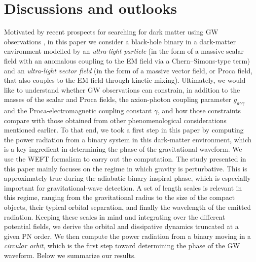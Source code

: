 \section{Discussions and outlooks}\label{disc}
Motivated by recent prospects for searching for dark matter using GW observations \cite{Zhang:2021mks, Coogan:2021uqv, Singh:2022wvw, Becker:2021ivq, Yue:2019ozq, Cardoso:2020iji,Bhattacharya:2023stq}, in this paper we consider a black-hole binary in a dark-matter environment modelled by an \textit{ultra-light particle} (in the form of a massive scalar field with an anomalous coupling to the EM field via a Chern--Simons-type term) and an \textit{ultra-light vector field} (in the form of a massive vector field, or Proca field, that also couples to the EM field through kinetic mixing). Ultimately, we would like to understand whether GW observations can constrain, in addition to the masses of the scalar and Proca fields, the axion-photon coupling parameter $g_{a\gamma\gamma}$ and the Proca-electromagnetic coupling constant $\gamma$, and how those constraints compare with those obtained from other phenomenological considerations mentioned earlier. To that end, we took a first step in this paper by computing the power radiation from a binary system in this dark-matter environment, which is a key ingredient in determining the phase of the gravitational waveform. We use the WEFT formalism to carry out the computation. The study presented in this paper mainly focuses on the regime in which gravity is perturbative. This is approximately true during the adiabatic binary inspiral phase, which is especially important for gravitational-wave detection. A set of length scales is relevant in this regime, ranging from the gravitational radius to the size of the compact objects, their typical orbital separation, and finally the wavelength of the emitted radiation. Keeping these scales in mind and integrating over the different potential fields, we derive the orbital and dissipative dynamics truncated at a given PN order. We then compute the power radiation from a binary moving in a \textit{circular orbit}, which is the first step toward determining the phase of the GW waveform. Below we summarize our results. 
